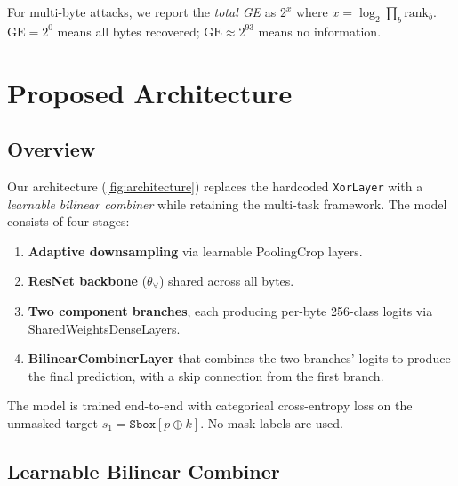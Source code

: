 \documentclass[submission]{iacrtrans}
\newcommand{\GE}{\mathrm{GE}}
\newcommand{\Sbox}{\mathtt{Sbox}}
\begin{document}
For multi-byte attacks, we report the \emph{total GE} as $2^x$ where $x = \log_2 \prod_b \text{rank}_b$. $\GE = 2^0$ means all bytes recovered; $\GE \approx 2^{93}$ means no information.


\section{Proposed Architecture}\label{sec:architecture}

\subsection{Overview}

Our architecture (\cref{fig:architecture}) replaces the hardcoded \texttt{XorLayer} with a \emph{learnable bilinear combiner} while retaining the multi-task framework. The model consists of four stages:
\begin{enumerate}[leftmargin=*]
  \item \textbf{Adaptive downsampling} via learnable PoolingCrop layers.
  \item \textbf{ResNet backbone} ($\theta_\forall$) shared across all bytes.
  \item \textbf{Two component branches}, each producing per-byte 256-class logits via SharedWeightsDenseLayers.
  \item \textbf{BilinearCombinerLayer} that combines the two branches' logits to produce the final prediction, with a skip connection from the first branch.
\end{enumerate}

The model is trained end-to-end with categorical cross-entropy loss on the unmasked target $s_1 = \Sbox[p \oplus k]$. No mask labels are used.


\subsection{Learnable Bilinear Combiner}\label{sec:bilinear}
\end{document}
